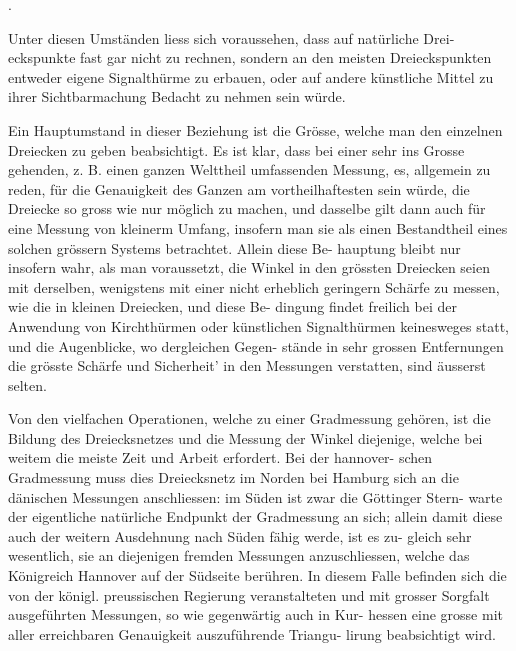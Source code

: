 \documentclass[12pt,a4paper]{article}
\theoremstyle{plain}
\theoremstyle{definition}
\theoremstyle{remark}
\begin{document}
.

\noindent
Unter diesen Umständen liess sich voraussehen, dass auf natürliche Drei-
eckspunkte fast gar nicht zu rechnen, sondern an den meisten Dreieckspunkten
entweder eigene Signalthürme zu erbauen, oder auf andere künstliche Mittel
zu ihrer Sichtbarmachung Bedacht zu nehmen sein würde.

\noindent
Ein Hauptumstand in dieser Beziehung ist die Grösse, welche man den
einzelnen Dreiecken zu geben beabsichtigt. Es ist klar, dass bei einer sehr
ins Grosse gehenden, z. B. einen ganzen Welttheil umfassenden Messung, es,
allgemein zu reden, für die Genauigkeit des Ganzen am vortheilhaftesten sein
würde, die Dreiecke so gross wie nur möglich zu machen, und dasselbe gilt
dann auch für eine Messung von kleinerm Umfang, insofern man sie als einen
Bestandtheil eines solchen grössern Systems betrachtet. Allein diese Be-
hauptung bleibt nur insofern wahr, als man voraussetzt, die Winkel in den
grössten Dreiecken seien mit derselben, wenigstens mit einer nicht erheblich
geringern Schärfe zu messen, wie die in kleinen Dreiecken, und diese Be-
dingung findet freilich bei der Anwendung von Kirchthürmen oder künstlichen
Signalthürmen keinesweges statt, und die Augenblicke, wo dergleichen Gegen-
stände in sehr grossen Entfernungen die grösste Schärfe und Sicherheit' in den
Messungen verstatten, sind äusserst selten.

\noindent



\noindent
Von den vielfachen Operationen, welche zu einer Gradmessung gehören,
ist die Bildung des Dreiecksnetzes und die Messung der Winkel diejenige,
welche bei weitem die meiste Zeit und Arbeit erfordert. Bei der hannover-
schen Gradmessung muss dies Dreiecksnetz im Norden bei Hamburg sich an
die dänischen Messungen anschliessen: im Süden ist zwar die Göttinger Stern-
warte der eigentliche natürliche Endpunkt der Gradmessung an sich; allein
damit diese auch der weitern Ausdehnung nach Süden fähig werde, ist es zu-
gleich sehr wesentlich, sie an diejenigen fremden Messungen anzuschliessen,
welche das Königreich Hannover auf der Südseite berühren. In diesem Falle
befinden sich die von der königl. preussischen Regierung veranstalteten und
mit grosser Sorgfalt ausgeführten Messungen, so wie gegenwärtig auch in Kur-
hessen eine grosse mit aller erreichbaren Genauigkeit auszuführende Triangu-
lirung beabsichtigt wird.
\end{document}
